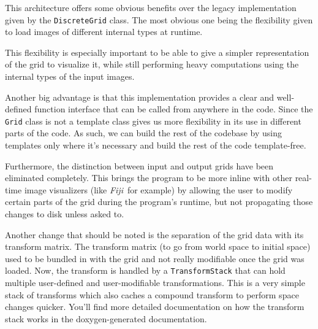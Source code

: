 {{		%
		This architecture offers some obvious benefits over the legacy implementation given by the \texttt{DiscreteGrid} class. The most obvious one being the flexibility given to load images of different internal types at runtime.\par
		This flexibility is especially important to be able to give a simpler representation of the grid to visualize it, while still performing heavy computations using the internal types of the input images.\par
		\myparspace
		Another big advantage is that this implementation provides a clear and well-defined function interface that can be called from anywhere in the code. Since the \texttt{Grid} class is not a template class gives us more flexibility in its use in different parts of the code. As such, we can build the rest of the codebase by using templates only where it's necessary and build the rest of the code template-free.\par
		\myparspace
		Furthermore, the distinction between input and output grids have been eliminated completely. This brings the program to be more inline with other real-time image visualizers (like \textit{Fiji}\footnotemark~for example) by allowing the user to modify certain parts of the grid during the program's runtime, but not propagating those changes to disk unless asked to.
		\par
		\myparspace
		Another change that should be noted is the separation of the grid data with its transform matrix. The transform matrix (to go from world space to initial space) used to be bundled in with the grid and not really modifiable once the grid was loaded. Now, the transform is handled by a \texttt{TransformStack} that can hold multiple user-defined and user-modifiable transformations. This is a very simple stack of transforms which also caches a compound transform to perform space changes quicker. You'll find more detailed documentation on how the transform stack works in the doxygen-generated documentation.
	}

}
